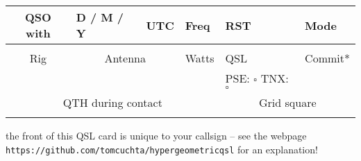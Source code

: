 \documentclass{article}
\begin{document}
\vspace*{0.01in}
\begin{center}
\begin{tabular}{|l|l|l|l|l|l|l|}
\hline
\multicolumn{2}{|c|}{QSO with} & D / M / Y & UTC & Freq & RST & Mode \\
\hline 
\multicolumn{2}{|c|}{\phantom{.....}} & & & & & \\
\hline
\multicolumn{2}{|c|}{Rig} & \multicolumn{2}{c|}{Antenna} & Watts & QSL & Commit* \\
\hline 
\multicolumn{2}{|c|}{\phantom{.....}} & \multicolumn{2}{c|}{\phantom{.}} &   & PSE: $\square$ TNX: $\square$ &  \\
\hline
\multicolumn{5}{|c|}{QTH during contact} & \multicolumn{2}{c|}{Grid square} \\ 
\hline 
\multicolumn{5}{|c|}{\phantom{.}} & \multicolumn{2}{c|}{\phantom{.}} \\
\hline
\end{tabular} 
\end{center}
\vfill
{\small *the front of this QSL card is unique to your callsign -- see the webpage \\ \texttt{https://github.com/tomcuchta/hypergeometricqsl} for an explanation!}
\end{document}
